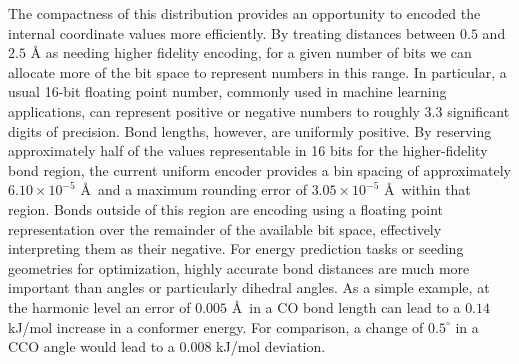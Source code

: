 \documentclass[%
 preprint,
superscriptaddress,
 amsmath,amssymb,
 aip,
 jcp,
]{revtex4-2}
\begin{document}
The compactness of this distribution provides an opportunity to encoded the internal coordinate values more efficiently.
By treating distances between $0.5$ and $2.5$ \AA{} as needing higher fidelity encoding, for a given number of bits we can allocate more of the bit space to represent numbers in this range.
In particular, a usual 16-bit floating point number, commonly used in machine learning applications, can represent positive or negative numbers to roughly 3.3 significant digits of precision.
Bond lengths, however, are uniformly positive.
By reserving approximately half of the values representable in 16 bits for the higher-fidelity bond region, the current uniform encoder provides a bin spacing of approximately $6.10\times10^{-5}$ \AA\ and a maximum rounding error of $3.05\times10^{-5}$ \AA\ within that region.
Bonds outside of this region are encoding using a floating point representation over the remainder of the available bit space, effectively interpreting them as their negative.
For energy prediction tasks or seeding geometries for optimization, highly accurate bond distances are much more important than angles or particularly dihedral angles.
As a simple example, at the harmonic level an error of $0.005$ \AA\ in a CO bond length can lead to a $0.14$ kJ/mol increase in a conformer energy.
For comparison, a change of $0.5^{\circ}$ in a CCO angle would lead to a $0.008$ kJ/mol deviation.




\end{document}
